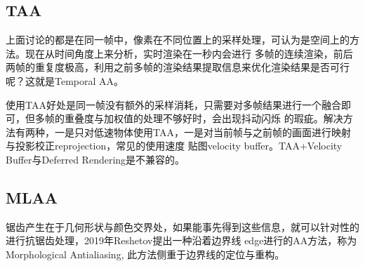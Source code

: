 \subsection{TAA}

上面讨论的都是在同一帧中，像素在不同位置上的采样处理，可认为是空间上的方法。现在从时间角度上来分析，实时渲染在一秒内会进行
多帧的连续渲染，前后两帧的重复度极高，利用之前多帧的渲染结果提取信息来优化渲染结果是否可行呢？这就是Temporal AA。 

使用TAA好处是同一帧没有额外的采样消耗，只需要对多帧结果进行一个融合即可，但多帧的重叠度与加权值的处理不够好时，会出现抖动闪烁
的瑕疵。解决方法有两种，一是只对低速物体使用TAA，一是对当前帧与之前帧的画面进行映射与投影校正reprojection，常见的使用速度
贴图velocity buffer。TAA+Velocity Buffer与Deferred Rendering是不兼容的。

\subsection{MLAA}

锯齿产生在于几何形状与颜色交界处，如果能事先得到这些信息，就可以针对性的进行抗锯齿处理，2019年Reshetov提出一种沿着边界线
edge进行的AA方法，称为Morphological Antialiasing, 此方法侧重于边界线的定位与重构。

